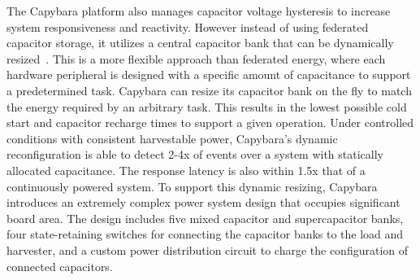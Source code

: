 The Capybara platform also manages capacitor voltage hysteresis to increase system responsiveness and reactivity. However instead of using federated capacitor storage, it utilizes a central capacitor bank that can be dynamically resized~\cite{colinReconfigurable18}.
This is a more flexible approach than federated energy, where each hardware peripheral is designed with a specific amount of capacitance to support a predetermined task.
Capybara can resize its capacitor bank on the fly to match the energy required by an arbitrary task. This results in the lowest possible cold start and capacitor recharge times to support a given operation.
Under controlled conditions with consistent harvestable power, Capybara's dynamic reconfiguration is able to detect 2-4x of events over a system with statically allocated capacitance. The response latency is also within 1.5x that of a continuously powered system.
To support this dynamic resizing, Capybara introduces an extremely complex power system design that occupies significant board area. The design includes five mixed capacitor and supercapacitor banks, four state-retaining switches for connecting the capacitor banks to the load and harvester, and a custom power distribution circuit to charge the configuration of connected capacitors.


